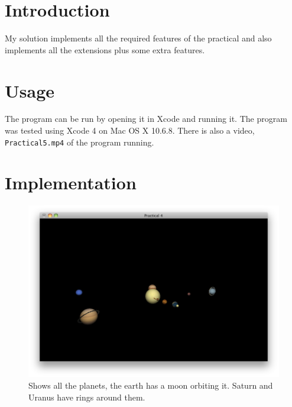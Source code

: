 
\section{Introduction} %
\label{sec:introduction}
My solution implements all the required features of the practical and also implements all the extensions plus some extra features.


\section{Usage} %
\label{sec:usage}
The program can be run by opening it in Xcode and running it. The program was tested using Xcode 4 on Mac OS X 10.6.8. There is also a video, \texttt{Practical5.mp4} of the program running.

\section{Implementation}

\begin{figure}[htbp]
	\centering
		\includegraphics[width=6.7in]{figures/main.png}
	\caption{Shows all the planets, the earth has a moon orbiting it. Saturn and Uranus have rings around them.}
	\label{fig:main}
\end{figure}


